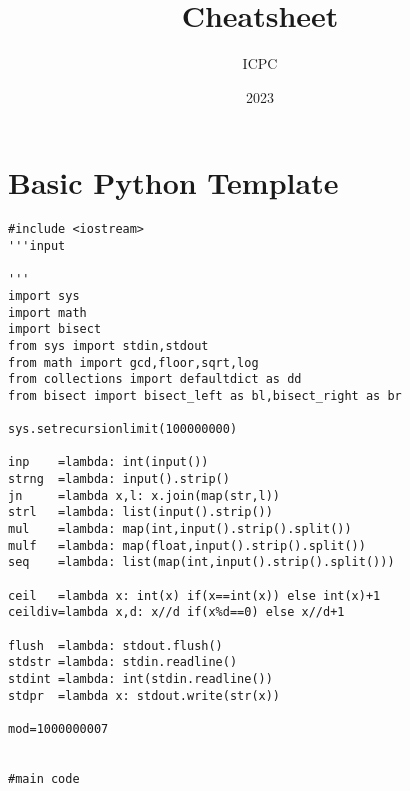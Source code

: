 \documentclass{article}
\title{Cheatsheet}
\date{2023}
\author{ICPC}
\begin{document}
\maketitle
\section{Basic Python Template}
\begin{lstlisting}[basicstyle=\large\ttfamily,linewidth=\columnwidth,breaklines=true,language==Python]
#include <iostream>
'''input

'''
import sys
import math
import bisect
from sys import stdin,stdout
from math import gcd,floor,sqrt,log
from collections import defaultdict as dd
from bisect import bisect_left as bl,bisect_right as br

sys.setrecursionlimit(100000000)

inp    =lambda: int(input())
strng  =lambda: input().strip()
jn     =lambda x,l: x.join(map(str,l))
strl   =lambda: list(input().strip())
mul    =lambda: map(int,input().strip().split())
mulf   =lambda: map(float,input().strip().split())
seq    =lambda: list(map(int,input().strip().split()))

ceil   =lambda x: int(x) if(x==int(x)) else int(x)+1
ceildiv=lambda x,d: x//d if(x%d==0) else x//d+1

flush  =lambda: stdout.flush()
stdstr =lambda: stdin.readline()
stdint =lambda: int(stdin.readline())
stdpr  =lambda x: stdout.write(str(x))

mod=1000000007


#main code


\end{lstlisting}
\end{document}
